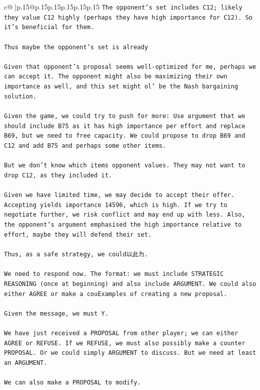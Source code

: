 \documentclass{article}
\begin{document}
{\begin{supertabular}{c@{$\;$}|p{.15\linewidth}@{}p{.15\linewidth}p{.15\linewidth}p{.15\linewidth}p{.15\linewidth}p{.15\linewidth}}
{{{\texttt{The opponent's set includes C12; likely they value C12 highly (perhaps they have high importance for C12). So it's beneficial for them.} \\
\\ 
\texttt{Thus maybe the opponent's set is already} \\
\\ 
\texttt{Given that opponent's proposal seems well{-}optimized for me, perhaps we can accept it. The opponent might also be maximizing their own importance as well, and this set might ol' be the Nash bargaining solution.} \\
\\ 
\texttt{Given the game, we could try to push for more: Use argument that we should include B75 as it has high importance per effort and replace B69, but we need to free capacity. We could propose to drop B69 and C12 and add B75 and perhaps some other items.} \\
\\ 
\texttt{But we don't know which items opponent values. They may not want to drop C12, as they included it.} \\
\\ 
\texttt{Given we have limited time, we may decide to accept their offer. Accepting yields importance 14596, which is high. If we try to negotiate further, we risk conflict and may end up with less. Also, the opponent's argument emphasised the high importance relative to effort, maybe they will defend their set.} \\
\\ 
\texttt{Thus, as a safe strategy, we could以此为.} \\
\\ 
\texttt{We need to respond now. The format: we must include STRATEGIC REASONING (once at beginning) and also include ARGUMENT. We could also either AGREE or make a couExamples of creating a new proposal.} \\
\\ 
\texttt{Given the message, we must	Y.} \\
\\ 
\texttt{We have just received a PROPOSAL from other player; we can either AGREE or REFUSE. If we REFUSE, we must also possibly make a counter PROPOSAL. Or we could simply ARGUMENT to discuss. But we need at least an ARGUMENT.} \\
\\ 
\texttt{We can also make a PROPOSAL to modify.} \\
\\ 
}}}
\end{supertabular}}
\end{document}
